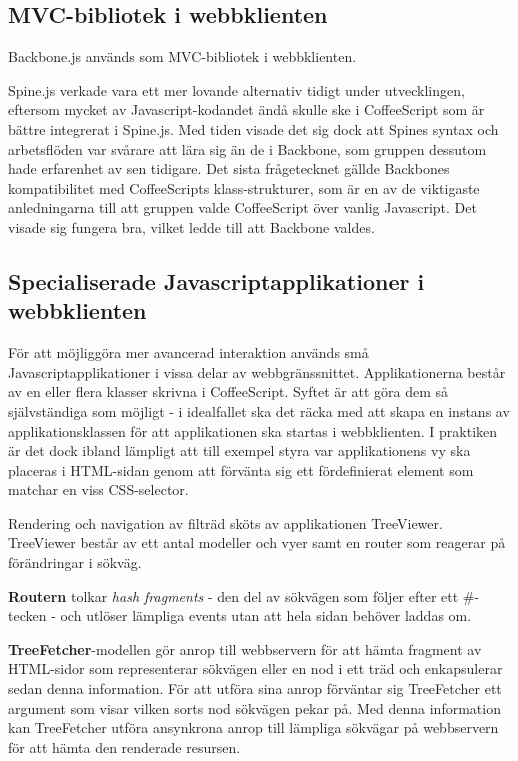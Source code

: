 \subsection{MVC-bibliotek i webbklienten}
Backbone.js används som MVC-bibliotek i webbklienten.

Spine.js verkade vara ett mer lovande alternativ tidigt under utvecklingen, eftersom mycket av Javascript-kodandet ändå skulle ske i CoffeeScript som är bättre integrerat i Spine.js. Med tiden visade det sig dock att Spines syntax och arbetsflöden var svårare att lära sig än de i Backbone, som gruppen dessutom hade erfarenhet av sen tidigare. Det sista frågetecknet gällde Backbones kompatibilitet med CoffeeScripts klass-strukturer, som är en av de viktigaste anledningarna till att gruppen valde CoffeeScript över vanlig Javascript. Det visade sig fungera bra, vilket ledde till att Backbone valdes.

\subsection{Specialiserade Javascriptapplikationer i webbklienten}
För att möjliggöra mer avancerad interaktion används små Javascriptapplikationer i vissa delar av webbgränssnittet. Applikationerna består av en eller flera klasser skrivna i CoffeeScript. Syftet är att göra dem så självständiga som möjligt - i idealfallet ska det räcka med att skapa en instans av applikationsklassen för att applikationen ska startas i webbklienten. I praktiken är det dock ibland lämpligt att till exempel styra var applikationens vy ska placeras i HTML-sidan genom att förvänta sig ett fördefinierat element som matchar en viss CSS-selector.

Rendering och navigation av filträd sköts av applikationen TreeViewer. TreeViewer består av ett antal modeller och vyer samt en router som reagerar på förändringar i sökväg. 

{\bf Routern} tolkar \emph{hash fragments} - den del av sökvägen som följer efter ett \#-tecken - och utlöser lämpliga events utan att hela sidan behöver laddas om.


{\bf TreeFetcher}-modellen gör anrop till webbservern för att hämta fragment av HTML-sidor som representerar sökvägen eller en nod i ett träd och enkapsulerar sedan denna information. För att utföra sina anrop förväntar sig TreeFetcher ett argument som visar vilken sorts nod sökvägen pekar på. Med denna information kan TreeFetcher utföra ansynkrona anrop till lämpliga sökvägar på webbservern för att hämta den renderade resursen.


